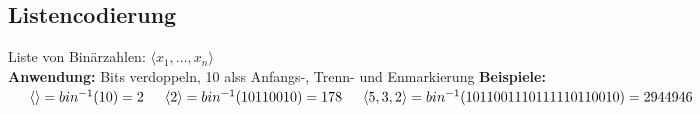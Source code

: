 \documentclass[14pt]{article}
\begin{document}
        \subsection{Listencodierung}
        Liste von Binärzahlen: $\langle x_1, \dots, x_n \rangle$ \\
        \textbf{Anwendung:} Bits verdoppeln, 10 alss Anfangs-, Trenn- und Enmarkierung
        \textbf{Beispiele:} \\
        $
            \indent \langle \rangle = bin^{-1}(10) = 2 \\
            \indent \langle 2 \rangle = bin^{-1}(10110010) = 178 \\
            \indent \langle 5, 3, 2 \rangle = bin^{-1}(1011001110111110110010) = 2944946
        $
\end{document}
